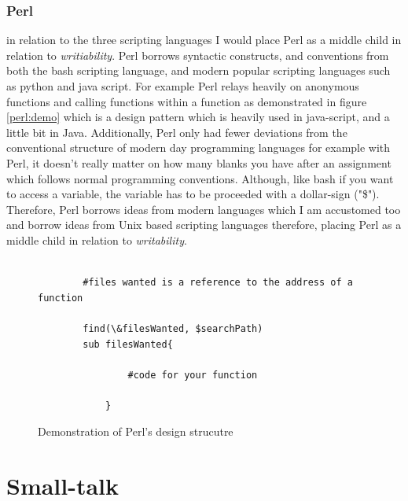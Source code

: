 \documentclass[
	12pt, %
]{fphw}
\begin{document}
\subsubsection{Perl} in relation to the three scripting languages I would place
Perl as a middle child in relation to \emph{writiability}. Perl borrows syntactic
constructs, and conventions from both the bash scripting language, and modern
popular scripting languages such as python and java script. For example Perl
relays heavily on anonymous functions and calling functions within a function
as demonstrated in figure \ref{perl:demo} which is a design
pattern which is heavily used in java-script, and a little bit in Java. Additionally,
Perl only had fewer deviations from the conventional structure of modern day programming languages
for example with Perl, it doesn't really matter on how many blanks you have after
an assignment which follows normal programming conventions. Although, like bash
if you want to access a variable, the variable has to be proceeded with a dollar-sign
("\$"). Therefore, Perl borrows ideas from modern languages which I am accustomed too
and borrow ideas from Unix based scripting languages therefore, placing Perl as
a middle child in relation to \emph{writability}.

\begin{figure}[!htp]
    \begin{problem}
        \begin{verbatim}

        #files wanted is a reference to the address of a function

        find(\&filesWanted, $searchPath)
        sub filesWanted{

                #code for your function

            }
        \end{verbatim}
    \end{problem}
    \caption{Demonstration of Perl's design strucutre}
    \label{Perl:demo}
\end{figure}

\section{Small-talk}
\end{document}
